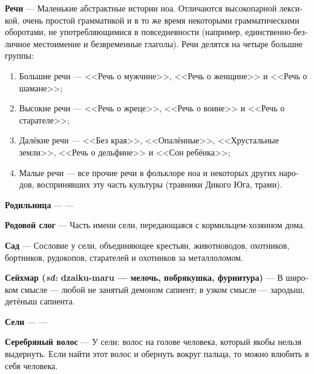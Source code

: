\documentclass[a4paper,12pt,fleqn]{book}\usepackage{polyglossia}\setdefaultlanguage[babelshorthands=true]{russian}\setotherlanguage{english}\defaultfontfeatures{Ligatures=TeX,Mapping=tex-text}\usepackage{xcolor}\newcommand{\ml}[3]{#2}
\newcommand{\theterm}[3]{\textbf{\hypertarget{#1}{#2}} --- #3}
\newcommand{\theorigin}[3]{\textit{#1:} #2 --- #3}
\begin{document}
{\theterm{talks}
{Речи}
{Маленькие абстрактные истории ноа.
Отличаются высокопарной лексикой, очень простой грамматикой и в то же время некоторыми грамматическими оборотами, не употребляющимися в повседневности (например, единственно-безличное местоимение и безвременные глаголы). Речи делятся на четыре большие группы:
\begin{enumerate}
\item Большие речи --- <<Речь о мужчине>>, <<Речь о женщине>> и <<Речь о шамане>>;
\item Высокие речи --- <<Речь о жреце>>, <<Речь о воине>> и <<Речь о старателе>>;
\item Далёкие речи --- <<Без края>>, <<Опалённые>>, <<Хрустальные земли>>, <<Речь о дельфине>> и <<Сон ребёнка>>;
\item Малые речи --- все прочие речи в фольклоре ноа и некоторых других народов, воспринявших эту часть культуры (травники Дикого Юга, трами).
\end{enumerate}}

\theterm{bearer}
{Родильница}
{---}

\theterm{family-syllable}
{Родовой слог}
{Часть имени сели, передающаяся с кормильцем-хозяином дома.}

\theterm{garden}
{Сад}
{Сословие у сели, объединяющее крестьян, животноводов, охотников, бортников, рудокопов, старателей и охотников за металлоломом.}

\theterm{seijmar}
{Сейхмар (\theorigin{sd}{dzaiku-maru}{мелочь, побрякушка, фурнитура})}
{В широком смысле --- любой не занятый демоном сапиент; в узком смысле --- зародыш, детёныш сапиента.}

\theterm{seli}
{Сели}
{---}

\theterm{silver-hair}
{Серебряный волос}
{У сели: волос на голове человека, который якобы нельзя выдернуть.
Если найти этот волос и обернуть вокруг пальца, то можно влюбить в себя человека.}

}
\end{document}
